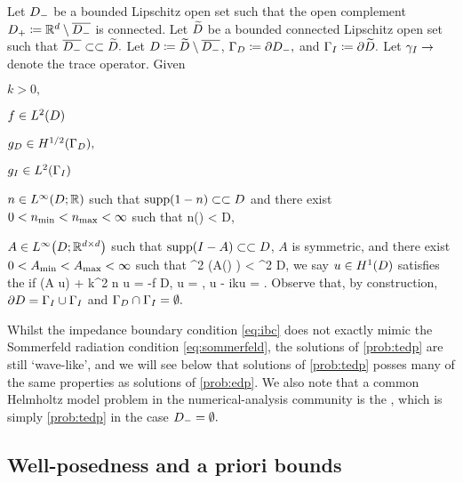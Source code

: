 \label{prob:tedp}
 Let $D_{-}$ be a bounded Lipschitz open set such that the open complement $D_{+} \coloneqq \mathbb R^{d} \setminus \overline{D_{-}}$ is connected. Let $\widetilde{D}$ be a bounded connected Lipschitz open set such that $\overline{D_{-}} \subset\subset \widetilde{D}.$ Let $D \coloneqq \widetilde{D} \setminus \overline{D_{-}}$, $\Gamma_{D} \coloneqq \partial D_{-},$ and $\Gamma_{I} \coloneqq \partial \widetilde{D}.$ Let $\gamma_{I} \rightarrow$ denote the trace operator. Given
  \bit
  \item $k > 0,$
\item $f \in \LtD$
\item $\gD \in \HhGD,$
  \item $\gI \in \LtGI$
\item $n \in \LiDRR$ such that $\supp\mleft(1-n\mright) \compcont D$ and there exist $0 < n_{\min} < n_{\max} < \infty$ such that
  \beqs
\nmin \leq n(\bx) < \nmax \tfae \bx \in D,
  \eeqs
\item $A \in \LiDRRdtd$ such that $\supp\mleft(I-A\mright)\compcont D$, $A$ is symmetric, and there exist $0 < A_{\min} < A_{\max} < \infty$ such that
  \beqs
\Amin \abs{\bxi}^2 \leq \mleft(A(\bx) \bxi \mright) \cdot \bxibar < \Amax \abs{\bxi}^2 \tfa \bxi \in \CCd \tfae \bx \in D,
  \eeqs
  \eit
  we say $u \in \HoD$ satisfies the  if
  \beqs
\grad \cdot \mleft(A \grad u\mright) + k^2 n u = -f \tin D,
\eeqs
\beqs
\trGD u = \gD, \tand
\eeqs
\beq\label{eq:ibc}
\trGI \dn u - ik\trGI u = \gI.
\eeq
\eprob
Observe that, by construction, $\partial D = \Gamma_{I} \cup \Gamma_{I}$ and $\Gamma_{D} \cap \Gamma_{I} = \emptyset.$

Whilst the impedance boundary condition \eqref{eq:ibc} does not exactly mimic the Sommerfeld radiation condition \eqref{eq:sommerfeld}, the solutions of \cref{prob:tedp} are still `wave-like', and we will see below that solutions of \cref{prob:tedp} posses many of the same properties as solutions of \cref{prob:edp}. We also note that a common Helmholtz model problem in the numerical-analysis community is the , which is simply \cref{prob:tedp} in the case $D_{-} = \emptyset.$


  \subsection{Well-posedness and a priori bounds}\label{sec:wpbounds}

